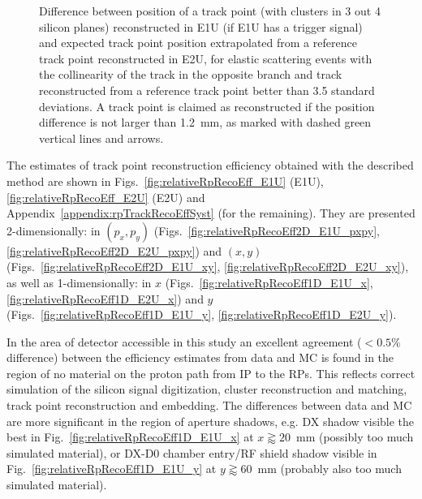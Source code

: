 \begin{figure}[b!]
{\begin{subfigure}[b]{\linewidth}
  \end{subfigure}
}%
\caption[Difference between measured and extrapolated position of track point in E1U.]%
    {Difference between position of a track point (with clusters in 3 out 4 silicon planes) reconstructed in E1U (if E1U has a trigger signal) and expected track point position extrapolated from a reference track point reconstructed in E2U, for elastic scattering events with the collinearity of the track in the opposite branch and track reconstructed from a reference track point better than 3.5 standard deviations. A track point is claimed as reconstructed if the position difference is not larger than 1.2~mm, as marked with dashed green vertical lines and arrows.}\label{fig:rpSystPositionDifference}%
\end{figure}

The estimates of track point reconstruction efficiency obtained with the described method are shown in Figs.~\ref{fig:relativeRpRecoEff_E1U} (E1U), \ref{fig:relativeRpRecoEff_E2U} (E2U) and Appendix~\ref{appendix:rpTrackRecoEffSyst} (for the remaining). They are presented 2-dimensionally: in $(p_{x},p_{y})$ (Figs.~\ref{fig:relativeRpRecoEff2D_E1U_pxpy}, \ref{fig:relativeRpRecoEff2D_E2U_pxpy}) and $(x,y)$ (Figs.~\ref{fig:relativeRpRecoEff2D_E1U_xy}, \ref{fig:relativeRpRecoEff2D_E2U_xy}), as well as 1-dimensionally: in $x$ (Figs.~\ref{fig:relativeRpRecoEff1D_E1U_x}, \ref{fig:relativeRpRecoEff1D_E2U_x}) and $y$ (Figs.~\ref{fig:relativeRpRecoEff1D_E1U_y}, \ref{fig:relativeRpRecoEff1D_E2U_y}).


In the area of detector accessible in this study an excellent agreement ($<0.5\%$ difference) between the efficiency estimates from data and MC is found in the region of no material on the proton path from IP to the RPs. This reflects correct simulation of the silicon signal digitization, cluster reconstruction and matching, track point reconstruction and embedding. The differences between data and MC are more significant in the region of aperture shadows, e.g. DX shadow visible the best in Fig.~\ref{fig:relativeRpRecoEff1D_E1U_x} at $x \gtrapprox 20$~mm (possibly too much simulated material), or DX-D0 chamber entry/RF shield shadow visible in Fig.~\ref{fig:relativeRpRecoEff1D_E1U_y} at $y \gtrapprox 60$~mm (probably also too much simulated material).


